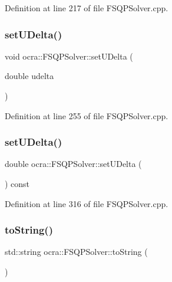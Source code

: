 Definition at line 217 of file F\+S\+Q\+P\+Solver.\+cpp.

\hypertarget{classocra_1_1FSQPSolver_aab6991e031ab120683b646968a5e8c91}{}\label{classocra_1_1FSQPSolver_aab6991e031ab120683b646968a5e8c91} 
\subsubsection{\texorpdfstring{set\+U\+Delta()}{setUDelta()}\hspace{0.1cm}{\footnotesize\ttfamily [1/2]}}
{\footnotesize\ttfamily void ocra\+::\+F\+S\+Q\+P\+Solver\+::set\+U\+Delta (\begin{DoxyParamCaption}\item[{double}]{udelta }\end{DoxyParamCaption})}



Definition at line 255 of file F\+S\+Q\+P\+Solver.\+cpp.

\hypertarget{classocra_1_1FSQPSolver_ac7b6382beb8d6426376322257e2c8393}{}\label{classocra_1_1FSQPSolver_ac7b6382beb8d6426376322257e2c8393} 
\subsubsection{\texorpdfstring{set\+U\+Delta()}{setUDelta()}\hspace{0.1cm}{\footnotesize\ttfamily [2/2]}}
{\footnotesize\ttfamily double ocra\+::\+F\+S\+Q\+P\+Solver\+::set\+U\+Delta (\begin{DoxyParamCaption}{ }\end{DoxyParamCaption}) const}



Definition at line 316 of file F\+S\+Q\+P\+Solver.\+cpp.

\hypertarget{classocra_1_1FSQPSolver_a3edc67c5c989d020ac8a77bf08946d14}{}\label{classocra_1_1FSQPSolver_a3edc67c5c989d020ac8a77bf08946d14} 
\subsubsection{\texorpdfstring{to\+String()}{toString()}}
{\footnotesize\ttfamily std\+::string ocra\+::\+F\+S\+Q\+P\+Solver\+::to\+String (\begin{DoxyParamCaption}{ }\end{DoxyParamCaption})\hspace{0.3cm}{\ttfamily [virtual]}}

